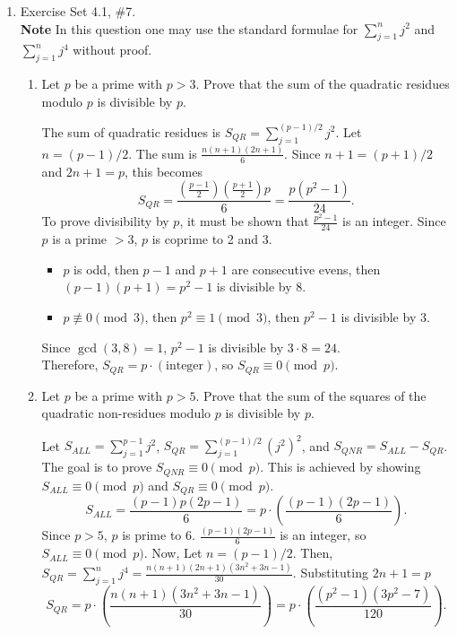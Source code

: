 \begin{enumerate}
  \newpage
  \item Exercise Set 4.1, \#7.\\
  \textbf{Note} In this question one may use the standard formulae for $\sum_{j=1}^n j^2$ and $\sum_{j=1}^n j^4$ without proof.
  \begin{enumerate}
    \item Let $p$ be a prime with $p>3$. Prove that the sum of the quadratic residues modulo $p$ is divisible by $p$.
    \begin{subprove}
      The sum of quadratic residues is $S_{QR} = \sum_{j=1}^{(p-1)/2} j^2$.
      Let $n = (p-1)/2$. The sum is $\frac{n(n+1)(2n+1)}{6}$.
      Since $n+1 = (p+1)/2$ and $2n+1 = p$, this becomes
      \[
        S_{QR} = \frac{\left(\frac{p-1}{2}\right)\left(\frac{p+1}{2}\right)p}{6} = \frac{p(p^2-1)}{24}.
      \]
      To prove divisibility by $p$, it must be shown that $\frac{p^2-1}{24}$ is an integer.
      Since $p$ is a prime $> 3$, $p$ is coprime to 2 and 3.
      \begin{itemize}
          \item $p$ is odd, then $p-1$ and $p+1$ are consecutive evens, then $(p-1)(p+1) = p^2-1$ is divisible by 8.
          \item $p \not\equiv 0 \pmod 3$, then $p^2 \equiv 1 \pmod 3$, then $p^2-1$ is divisible by 3.
      \end{itemize}
      Since $\gcd(3, 8)=1$, $p^2-1$ is divisible by $3 \cdot 8 = 24$.\vspace*{10px}\\
      Therefore, $S_{QR} = p \cdot (\text{integer})$, so $S_{QR} \equiv 0 \pmod p$.
    \end{subprove}
    \item Let $p$ be a prime with $p>5$. Prove that the sum of the squares of the quadratic non-residues modulo $p$ is divisible by $p$.
    \begin{subprove}
      Let $S_{ALL} = \sum_{j=1}^{p-1} j^2$, $S_{QR} = \sum_{j=1}^{(p-1)/2} (j^2)^2$, and $S_{QNR} = S_{ALL} - S_{QR}$.
      The goal is to prove $S_{QNR} \equiv 0 \pmod p$. 
      This is achieved by showing $S_{ALL} \equiv 0 \pmod p$ and $S_{QR} \equiv 0 \pmod p$.
      \[
        S_{ALL} = \frac{(p-1)p(2p-1)}{6} = p \cdot \left(\frac{(p-1)(2p-1)}{6}\right).
      \]
      Since $p>5$, $p$ is prime to 6. $\frac{(p-1)(2p-1)}{6}$ is an integer, so $S_{ALL} \equiv 0 \pmod p$. Now,
      Let $n = (p-1)/2$. Then, $S_{QR} = \sum_{j=1}^{n} j^4 = \frac{n(n+1)(2n+1)(3n^2+3n-1)}{30}$.
      Substituting $2n+1 = p$
      \[
        S_{QR} = p \cdot \left( \frac{n(n+1)(3n^2+3n-1)}{30} \right) = p \cdot \left( \frac{(p^2-1)(3p^2-7)}{120} \right).
\]
\end{subprove}
\end{enumerate}
\end{enumerate}
